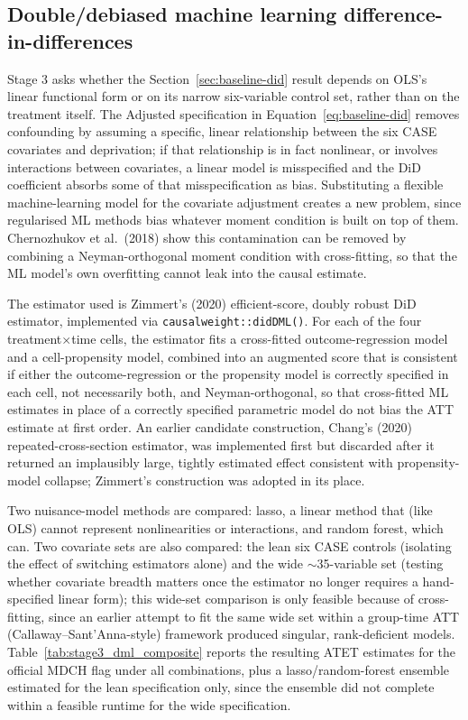 

\subsection{Double/debiased machine learning difference-in-differences}
\label{sec:dml}

Stage 3 asks whether the Section~\ref{sec:baseline-did} result depends on OLS's linear functional form or on its narrow six-variable control set, rather than on the treatment itself. The Adjusted specification in Equation~\ref{eq:baseline-did} removes confounding by assuming a specific, linear relationship between the six CASE covariates and deprivation; if that relationship is in fact nonlinear, or involves interactions between covariates, a linear model is misspecified and the DiD coefficient absorbs some of that misspecification as bias. Substituting a flexible machine-learning model for the covariate adjustment creates a new problem, since regularised ML methods bias whatever moment condition is built on top of them. Chernozhukov et al.\ (2018) show this contamination can be removed by combining a Neyman-orthogonal moment condition with cross-fitting, so that the ML model's own overfitting cannot leak into the causal estimate.

The estimator used is Zimmert's (2020) efficient-score, doubly robust DiD estimator, implemented via \texttt{causalweight::didDML()}. For each of the four treatment$\times$time cells, the estimator fits a cross-fitted outcome-regression model and a cell-propensity model, combined into an augmented score that is consistent if either the outcome-regression or the propensity model is correctly specified in each cell, not necessarily both, and Neyman-orthogonal, so that cross-fitted ML estimates in place of a correctly specified parametric model do not bias the ATT estimate at first order. An earlier candidate construction, Chang's (2020) repeated-cross-section estimator, was implemented first but discarded after it returned an implausibly large, tightly estimated effect consistent with propensity-model collapse; Zimmert's construction was adopted in its place.

Two nuisance-model methods are compared: lasso, a linear method that (like OLS) cannot represent nonlinearities or interactions, and random forest, which can. Two covariate sets are also compared: the lean six CASE controls (isolating the effect of switching estimators alone) and the wide $\sim$35-variable set (testing whether covariate breadth matters once the estimator no longer requires a hand-specified linear form); this wide-set comparison is only feasible because of cross-fitting, since an earlier attempt to fit the same wide set within a group-time ATT (Callaway--Sant'Anna-style) framework produced singular, rank-deficient models. Table~\ref{tab:stage3_dml_composite} reports the resulting ATET estimates for the official MDCH flag under all combinations, plus a lasso/random-forest ensemble estimated for the lean specification only, since the ensemble did not complete within a feasible runtime for the wide specification.

